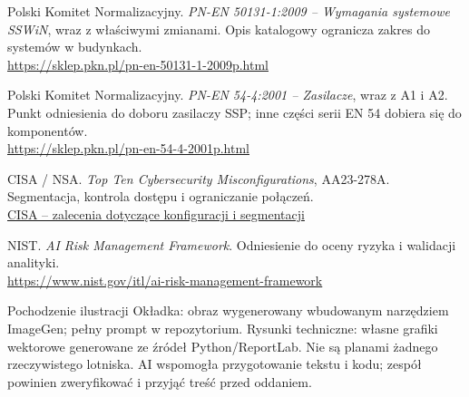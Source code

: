 \begin{enumerate}[label={[\arabic*]},itemsep=8pt,leftmargin=8mm]
\item Polski Komitet Normalizacyjny. \textit{PN-EN 50131-1:2009 -- Wymagania systemowe SSWiN}, wraz z właściwymi zmianami. Opis katalogowy ogranicza zakres do systemów w budynkach.\\\url{https://sklep.pkn.pl/pn-en-50131-1-2009p.html}
\item Polski Komitet Normalizacyjny. \textit{PN-EN 54-4:2001 -- Zasilacze}, wraz z A1 i A2. Punkt odniesienia do doboru zasilaczy SSP; inne części serii EN 54 dobiera się do komponentów.\\\url{https://sklep.pkn.pl/pn-en-54-4-2001p.html}
\item CISA / NSA. \textit{Top Ten Cybersecurity Misconfigurations}, AA23-278A. Segmentacja, kontrola dostępu i ograniczanie połączeń.\\\href{https://www.cisa.gov/news-events/cybersecurity-advisories/aa23-278a}{CISA -- zalecenia dotyczące konfiguracji i segmentacji}
\item NIST. \textit{AI Risk Management Framework}. Odniesienie do oceny ryzyka i walidacji analityki.\\\url{https://www.nist.gov/itl/ai-risk-management-framework}
\end{enumerate}

\vfill
\begin{note}{Pochodzenie ilustracji}
Okładka: obraz wygenerowany wbudowanym narzędziem ImageGen; pełny prompt w repozytorium. Rysunki techniczne: własne grafiki wektorowe generowane ze źródeł Python/ReportLab. Nie są planami żadnego rzeczywistego lotniska. AI wspomogła przygotowanie tekstu i kodu; zespół powinien zweryfikować i przyjąć treść przed oddaniem.
\end{note}
